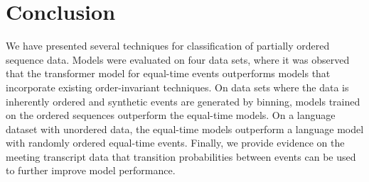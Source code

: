 \documentclass[reqno ,11pt]{article}
\begin{document}
\begin{table}[h!]
\begin{center}
\caption{Performance Metrics}

\label{tab:perform-metrics}
\end{center}
\end{table}

\section{Conclusion}
We have presented several techniques for classification of partially ordered sequence data. Models were evaluated on four data sets, where it was observed that the transformer model for equal-time events outperforms models that incorporate existing order-invariant techniques. On data sets where the data is inherently ordered and synthetic events are generated by binning, models trained on the ordered sequences outperform the equal-time models. On a language dataset with unordered data, the equal-time models outperform a language model with randomly ordered equal-time events. Finally, we provide evidence on the meeting transcript data that transition probabilities between events can be used to further improve model performance.

\begin{footnotesize}
\centering
\end{footnotesize}
\end{document}
